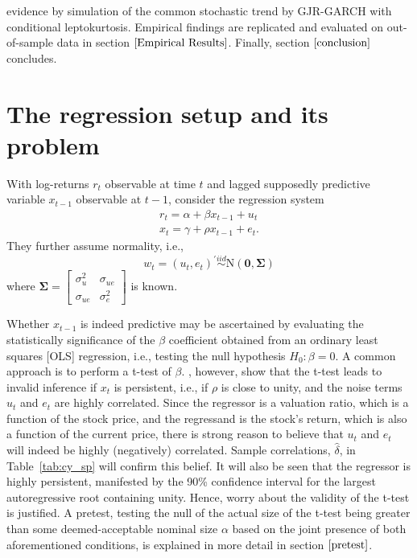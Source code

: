 \documentclass{article}
\begin{document}
evidence by simulation of the common stochastic trend by GJR-GARCH with conditional leptokurtosis. Empirical findings are replicated and evaluated on out-of-sample data in section $\ref{Empirical Results}$. Finally, section $\ref{conclusion}$ concludes.

\section{The regression setup and its problem}
\label{regression}
With log-returns $r_{t}$ observable at time $t$ and lagged supposedly predictive variable $x_{t-1}$ observable at $t-1$,  \citet{campbell2006efficient} consider the regression system
\begin{align} 
\label{eqn:1}
r_{t} = \alpha + \beta x_{t-1} + u_{t} \\ 
\label{eqn:2}
x_{t} = \gamma + \rho  x_{t-1} + e_{t}.
\end{align}
They further assume normality, i.e., 
\begin{equation}
w_{t}=\left(u_{t}, e_{t}\right)^{\prime} \stackrel{i i d}{\sim} \mathrm{N}(\boldsymbol{0}, \boldsymbol{\Sigma})
\end{equation} where  $\boldsymbol{\Sigma}=\left[\begin{array}{cc}{\sigma_{u}^{2}} & {\sigma_{u e}} \\ {\sigma_{u e}} & {\sigma_{e}^{2}}\end{array}\right]$ is known.


Whether $x_{t-1}$ is indeed predictive may be ascertained by evaluating the statistically significance of the $\beta$ coefficient obtained from an ordinary least squares [OLS] regression, i.e., testing the null hypothesis $H_0: \beta = 0$. A common approach is to perform a t-test of $\beta$. \citet{elliott1994inference}, however, show that the t-test leads to invalid inference if $x_{t}$ is persistent, i.e., if $\rho$ is close to unity, and the noise terms $u_{t}$ and $e_{t}$ are highly correlated. Since the regressor is a valuation ratio, which is a function of the stock price, and the regressand is the stock's return, which is also a function of the current price, there is strong reason to believe that $u_{t}$ and $e_{t}$ will indeed be highly (negatively) correlated. Sample correlations, $\hat{\delta}$, in Table~\vref{tab:cy_sp} will confirm this belief. It will also be seen that the regressor is highly persistent, manifested by the 90\% confidence interval for the largest autoregressive root containing unity. Hence, worry about the validity of the t-test is justified. A pretest, testing the null of the actual size of the t-test being greater than some deemed-acceptable nominal size $\alpha$ based on the joint presence of both aforementioned conditions, is explained in more detail in section $\ref{pretest}$.
\end{document}
